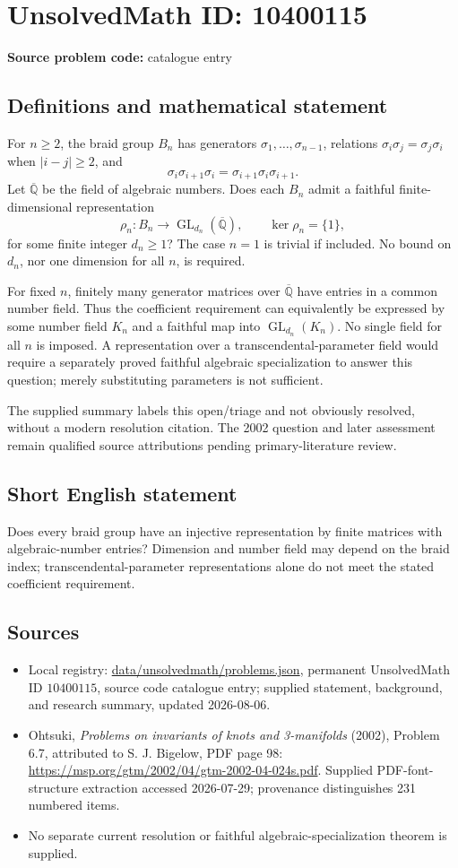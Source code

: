 \documentclass[11pt]{article}
\begin{document}
\section*{UnsolvedMath ID: 10400115}
\textbf{Source problem code:} catalogue entry
\subsection{Definitions and mathematical statement}
For \(n\ge2\), the braid group \(B_n\) has generators \(\sigma_1,\ldots,\sigma_{n-1}\), relations \(\sigma_i\sigma_j=\sigma_j\sigma_i\) when \(|i-j|\ge2\), and
\[
 \sigma_i\sigma_{i+1}\sigma_i=\sigma_{i+1}\sigma_i\sigma_{i+1}.
\]
Let \(\overline{\mathbb Q}\) be the field of algebraic numbers. Does each \(B_n\) admit a faithful finite-dimensional representation
\[
 \rho_n:B_n\longrightarrow\operatorname{GL}_{d_n}(\overline{\mathbb Q}),
 \qquad\ker\rho_n=\{1\},
\]
for some finite integer \(d_n\ge1\)? The case \(n=1\) is trivial if included. No bound on \(d_n\), nor one dimension for all \(n\), is required.

For fixed \(n\), finitely many generator matrices over \(\overline{\mathbb Q}\) have entries in a common number field. Thus the coefficient requirement can equivalently be expressed by some number field \(K_n\) and a faithful map into \(\operatorname{GL}_{d_n}(K_n)\). No single field for all \(n\) is imposed. A representation over a transcendental-parameter field would require a separately proved faithful algebraic specialization to answer this question; merely substituting parameters is not sufficient.

The supplied summary labels this open/triage and not obviously resolved, without a modern resolution citation. The 2002 question and later assessment remain qualified source attributions pending primary-literature review.
\subsection{Short English statement}
Does every braid group have an injective representation by finite matrices with algebraic-number entries? Dimension and number field may depend on the braid index; transcendental-parameter representations alone do not meet the stated coefficient requirement.
\subsection{Sources}
\begin{itemize}
\item Local registry: \url{data/unsolvedmath/problems.json}, permanent UnsolvedMath ID \(10400115\), source code catalogue entry; supplied statement, background, and research summary, updated 2026-08-06.
\item Ohtsuki, \emph{Problems on invariants of knots and 3-manifolds} (2002), Problem 6.7, attributed to S. J. Bigelow, PDF page 98: \url{https://msp.org/gtm/2002/04/gtm-2002-04-024s.pdf}. Supplied PDF-font-structure extraction accessed 2026-07-29; provenance distinguishes 231 numbered items.
\item No separate current resolution or faithful algebraic-specialization theorem is supplied.
\end{itemize}
\end{document}
